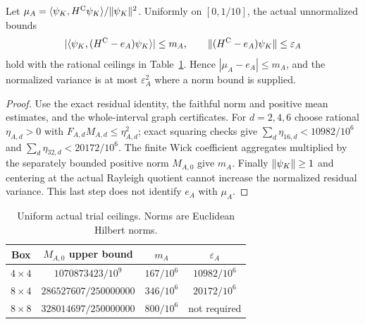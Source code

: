 \begin{proposition}\label{prop:trialbounds}
Let $\mu_A=\langle \psi_K,H^{\rm C}\psi_K\rangle/\lVert \psi_K\rVert^2$.
Uniformly on $[0,1/10]$, the actual unnormalized bounds
\[
 |\langle \psi_K,(H^{\rm C}-e_A)\psi_K\rangle|\le m_A,\qquad
 \lVert (H^{\rm C}-e_A)\psi_K\rVert\le\varepsilon_A
\]
hold with the rational ceilings in Table~\ref{tab:trial}. Hence
$|\mu_A-e_A|\le m_A$, and the normalized variance is at most
$\varepsilon_A^2$ where a norm bound is supplied.
\end{proposition}
\begin{proof}
Use the exact residual identity, the faithful norm and positive mean estimates,
and the whole-interval graph certificates. For $d=2,4,6$ choose rational
$\eta_{A,d}>0$ with $F_{A,d}M_{A,d}\le\eta_{A,d}^2$; exact squaring checks give
$\sum_d\eta_{16,d}<10982/10^6$ and
$\sum_d\eta_{32,d}<20172/10^6$.
The finite Wick coefficient aggregates multiplied by the separately bounded
positive norm $M_{A,0}$ give $m_A$. Finally $\lVert \psi_K\rVert\ge1$ and centering
at the actual Rayleigh quotient cannot increase the normalized residual
variance. This last step does not identify $e_A$ with $\mu_A$.
\end{proof}
\begin{table}[ht]\centering
\begin{tabular}{c c c c}\toprule
Box & $M_{A,0}$ upper bound & $m_A$ & $\varepsilon_A$\\\midrule
$4\times4$ & $1070873423/10^9$ & $167/10^6$ & $10982/10^6$\\
$8\times4$ & $286527607/250000000$ & $346/10^6$ & $20172/10^6$\\
$8\times8$ & $328014697/250000000$ & $800/10^6$ & not required\\\bottomrule
\end{tabular}
\caption{Uniform actual trial ceilings. Norms are Euclidean Hilbert norms.}\label{tab:trial}
\end{table}
